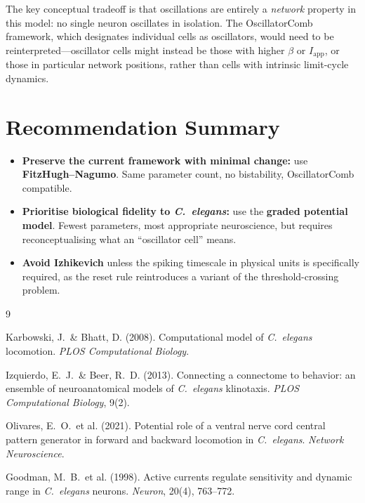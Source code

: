 \documentclass[11pt]{article}
\begin{document}
The key conceptual tradeoff is that oscillations are entirely a \emph{network} property in
this model: no single neuron oscillates in isolation. The OscillatorComb framework, which
designates individual cells as oscillators, would need to be reinterpreted---oscillator cells
might instead be those with higher $\beta$ or $I_{\mathrm{app}}$, or those in particular
network positions, rather than cells with intrinsic limit-cycle dynamics.

\section{Recommendation Summary}

\begin{itemize}
    \item \textbf{Preserve the current framework with minimal change:} use
          \textbf{FitzHugh--Nagumo}. Same parameter count, no bistability, OscillatorComb
          compatible.
    \item \textbf{Prioritise biological fidelity to \textit{C.~elegans}:} use the
          \textbf{graded potential model}. Fewest parameters, most appropriate neuroscience,
          but requires reconceptualising what an ``oscillator cell'' means.
    \item \textbf{Avoid Izhikevich} unless the spiking timescale in physical units is
          specifically required, as the reset rule reintroduces a variant of the
          threshold-crossing problem.
\end{itemize}

\begin{thebibliography}{9}

Karbowski, J.\ \& Bhatt, D. (2008).
Computational model of \textit{C.~elegans} locomotion.
\textit{PLOS Computational Biology}.

Izquierdo, E.~J.\ \& Beer, R.~D. (2013).
Connecting a connectome to behavior: an ensemble of neuroanatomical models of
\textit{C.~elegans} klinotaxis.
\textit{PLOS Computational Biology}, 9(2).

Olivares, E.~O.\ et al. (2021).
Potential role of a ventral nerve cord central pattern generator in forward and backward
locomotion in \textit{C.~elegans}.
\textit{Network Neuroscience}.

Goodman, M.~B.\ et al. (1998).
Active currents regulate sensitivity and dynamic range in \textit{C.~elegans} neurons.
\textit{Neuron}, 20(4), 763--772.

\end{thebibliography}
\end{document}
